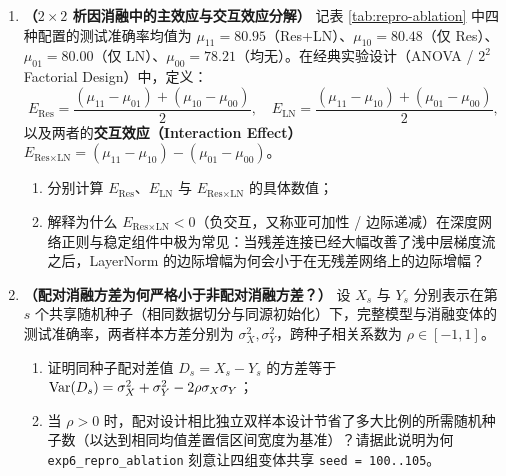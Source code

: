
\begin{enumerate}[label=\textbf{7.6.\arabic*}, start=3]
  \item \textbf{（$2 \times 2$ 析因消融中的主效应与交互效应分解）} 记表 \ref{tab:repro-ablation} 中四种配置的测试准确率均值为 $\mu_{11} = 80.95$（Res+LN）、$\mu_{10} = 80.48$（仅 Res）、$\mu_{01} = 80.00$（仅 LN）、$\mu_{00} = 78.21$（均无）。在经典实验设计（ANOVA / $2^2$ Factorial Design）中，定义：
  \[
    E_{\text{Res}} = \frac{(\mu_{11} - \mu_{01}) + (\mu_{10} - \mu_{00})}{2}, \quad
    E_{\text{LN}} = \frac{(\mu_{11} - \mu_{10}) + (\mu_{01} - \mu_{00})}{2},
  \]
  以及两者的\textbf{交互效应（Interaction Effect）} $E_{\text{Res}\times\text{LN}} = (\mu_{11} - \mu_{10}) - (\mu_{01} - \mu_{00})$。
  \begin{enumerate}
    \item 分别计算 $E_{\text{Res}}$、$E_{\text{LN}}$ 与 $E_{\text{Res}\times\text{LN}}$ 的具体数值；
    \item 解释为什么 $E_{\text{Res}\times\text{LN}} < 0$（负交互，又称亚可加性 / 边际递减）在深度网络正则与稳定组件中极为常见：当残差连接已经大幅改善了浅中层梯度流之后，LayerNorm 的边际增幅为何会小于在无残差网络上的边际增幅？
  \end{enumerate}

  \item \textbf{（配对消融方差为何严格小于非配对消融方差？）} 设 $X_s$ 与 $Y_s$ 分别表示在第 $s$ 个共享随机种子（相同数据切分与同源初始化）下，完整模型与消融变体的测试准确率，两者样本方差分别为 $\sigma_X^2, \sigma_Y^2$，跨种子相关系数为 $\rho \in [-1, 1]$。
  \begin{enumerate}
    \item 证明同种子配对差值 $D_s = X_s - Y_s$ 的方差等于 $\operatorname{Var}(D_s) = \sigma_X^2 + \sigma_Y^2 - 2\rho\sigma_X\sigma_Y$；
    \item 当 $\rho > 0$ 时，配对设计相比独立双样本设计节省了多大比例的所需随机种子数（以达到相同均值差置信区间宽度为基准）？请据此说明为何 \texttt{exp6\_repro\_ablation} 刻意让四组变体共享 \texttt{seed = 100..105}。
  \end{enumerate}
\end{enumerate}


